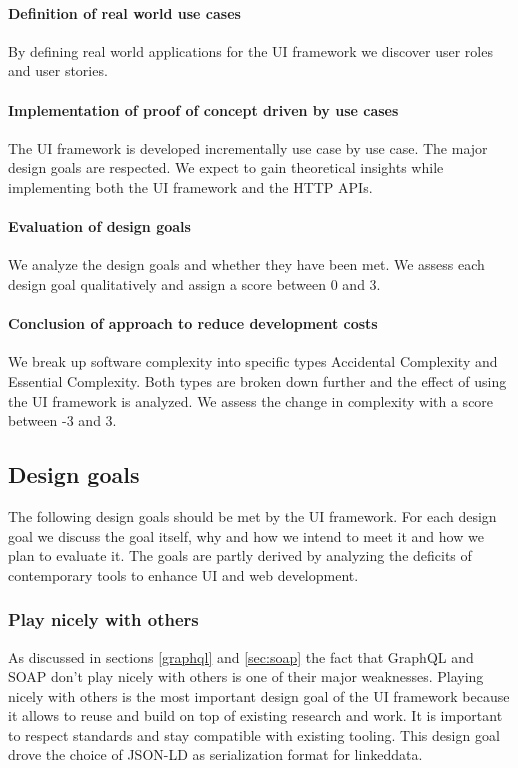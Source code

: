 \paragraph{Definition of real world use cases}
By defining real world applications for the UI framework we discover user roles and user stories.

\paragraph{Implementation of proof of concept driven by use cases}
The UI framework is developed incrementally use case by use case. The major design goals are respected. We expect to gain theoretical insights while implementing both the UI framework and the HTTP APIs.

\paragraph{Evaluation of design goals}
We analyze the design goals and whether they have been met. We assess each design goal qualitatively and assign a score between 0 and 3.

\paragraph{Conclusion of approach to reduce development costs}
We break up software complexity into specific types Accidental Complexity and Essential Complexity. Both types are broken down further and the effect of using the UI framework is analyzed. We assess the change in complexity with a score between -3 and 3.

\subsection{Design goals}\label{sec:designgoals}
The following design goals should be met by the UI framework. For each design goal we discuss the goal itself, why and how we intend to meet it and how we plan to evaluate it.
The goals are partly derived by analyzing the deficits of contemporary tools to enhance UI and web development.

\subsubsection{Play nicely with others}\label{sec:playnice}
As discussed in sections \ref{graphql} and \ref{sec:soap} the fact that GraphQL and SOAP don't play nicely with others is one of their major weaknesses. Playing nicely with others is the most important design goal of the UI framework because it allows to reuse and build on top of existing research and work.
It is important to respect standards and stay compatible with existing tooling. This design goal drove the choice of JSON-LD as serialization format for \gls{linkeddata}.


